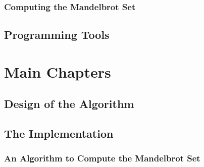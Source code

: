 \subsection{Computing the Mandelbrot Set}


\section{Programming Tools}

\chapter{Main Chapters}
\section{Design of the Algorithm}

\section{The Implementation}

\subsection{An Algorithm to Compute the Mandelbrot Set}


